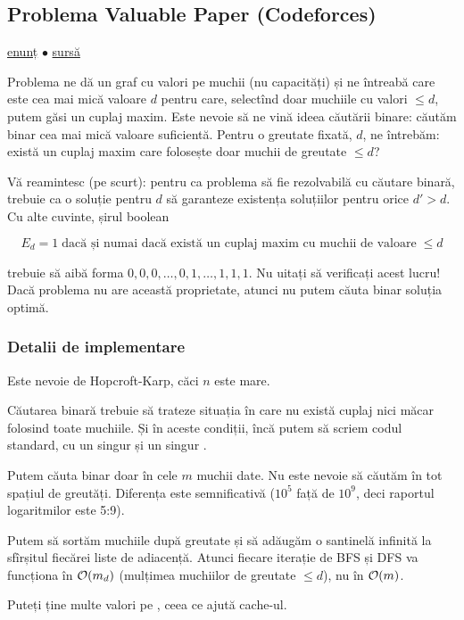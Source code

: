 \documentclass[../main.tex]{subfiles}
\begin{document}
\subsection{Problema Valuable Paper (Codeforces)}
\label{problem:valuable-paper}

\href{https://codeforces.com/contest/1423/problem/B}{enunț}
$\bullet$
\hyperref[code:valuable-paper]{sursă}

Problema ne dă un graf cu valori pe muchii (nu capacități) și ne întreabă care este cea mai mică valoare $d$ pentru care, selectînd doar muchiile cu valori $\leq d$, putem găsi un cuplaj maxim. Este nevoie să ne vină ideea căutării binare: căutăm binar cea mai mică valoare suficientă. Pentru o greutate fixată, $d$, ne întrebăm: există un cuplaj maxim care folosește doar muchii de greutate $\leq d$?

Vă reamintesc (pe scurt): pentru ca problema să fie rezolvabilă cu căutare binară, trebuie ca o soluție pentru $d$ să garanteze existența soluțiilor pentru orice $d' > d$. Cu alte cuvinte, șirul boolean

$$E_d = 1 \; \textrm{dacă și numai dacă există un cuplaj maxim cu muchii de valoare} \; \leq d$$

trebuie să aibă forma $0, 0, 0, \dots, 0, 1, \dots, 1, 1, 1$. Nu uitați să verificați acest lucru! Dacă problema nu are această proprietate, atunci nu putem căuta binar soluția optimă.

\subsubsection*{Detalii de implementare}

Este nevoie de Hopcroft-Karp, căci $n$ este mare.

Căutarea binară trebuie să trateze situația în care nu există cuplaj nici măcar folosind toate muchiile. Și în aceste condiții, încă putem să scriem codul standard, cu un singur  și un singur .

Putem căuta binar doar în cele $m$ muchii date. Nu este nevoie să căutăm în tot spațiul de greutăți. Diferența este semnificativă ($10^5$ față de $10^9$, deci raportul logaritmilor este 5:9).

Putem să sortăm muchiile după greutate și să adăugăm o santinelă infinită la sfîrșitul fiecărei liste de adiacență. Atunci fiecare iterație de BFS și DFS va funcționa în $\mathcal{O}(m_d)$ (mulțimea muchiilor de greutate $\leq d$), nu în $\mathcal{O}(m)$.

Puteți ține multe valori pe , ceea ce ajută cache-ul.
\end{document}
